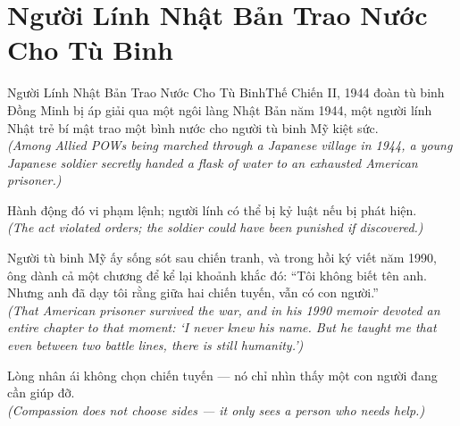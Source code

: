 \section{Người Lính Nhật Bản Trao Nước Cho Tù Binh}
\begin{truyen}{Người Lính Nhật Bản Trao Nước Cho Tù Binh}{Thế Chiến II, 1944}
 đoàn tù binh Đồng Minh bị áp giải qua một ngôi làng Nhật Bản năm 1944, một người lính Nhật trẻ bí mật trao một bình nước cho người tù binh Mỹ kiệt sức.\\[4pt]
\textit{(Among Allied POWs being marched through a Japanese village in 1944, a young Japanese soldier secretly handed a flask of water to an exhausted American prisoner.)}

Hành động đó vi phạm lệnh; người lính có thể bị kỷ luật nếu bị phát hiện.\\[4pt]
\textit{(The act violated orders; the soldier could have been punished if discovered.)}

Người tù binh Mỹ ấy sống sót sau chiến tranh, và trong hồi ký viết năm 1990, ông dành cả một chương để kể lại khoảnh khắc đó: ``Tôi không biết tên anh. Nhưng anh đã dạy tôi rằng giữa hai chiến tuyến, vẫn có con người.''\\[4pt]
\textit{(That American prisoner survived the war, and in his 1990 memoir devoted an entire chapter to that moment: `I never knew his name. But he taught me that even between two battle lines, there is still humanity.')}

\end{truyen}
\begin{baihoc}
  Lòng nhân ái không chọn chiến tuyến --- nó chỉ nhìn thấy một con người đang cần giúp đỡ.\\[4pt]
  \textit{(Compassion does not choose sides --- it only sees a person who needs help.)}
\end{baihoc}

